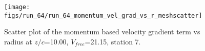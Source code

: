 \begin{figure}[H]
\centering
\texttt{[image: figs/run\_64/run\_64\_momentum\_vel\_grad\_vs\_r\_meshscatter]}
\caption{Scatter plot of the momentum based velocity gradient term vs radius at $z/c$=10.00, $V_{free}$=21.15, station 7.}
\label{fig:run_64_momentum_vel_grad_vs_r_meshscatter}
\end{figure}


